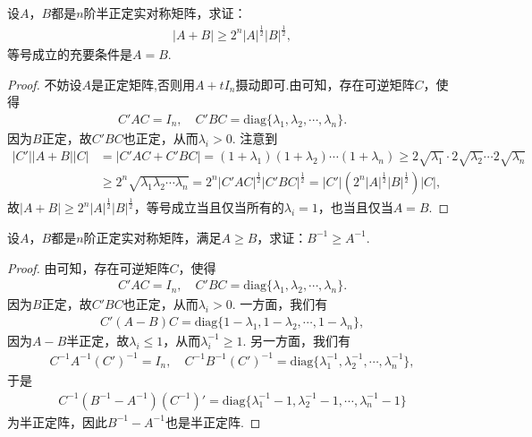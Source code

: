 \documentclass[../../main.tex]{subfiles}%
\begin{document}
\begin{proposition}\label{proposition:例9.77}
设\(A\)，\(B\)都是\(n\)阶半正定实对称矩阵，求证：
\begin{align*}
\vert A + B\vert\geqslant 2^n\vert A\vert^{\frac{1}{2}}\vert B\vert^{\frac{1}{2}},
\end{align*}
等号成立的充要条件是\(A = B\).
\end{proposition}
\begin{proof}
不妨设$A$是正定矩阵,否则用$A+tI_n$摄动即可.由可知，存在可逆矩阵\(C\)，使得
\begin{align*}
C'AC = I_n,\quad C'BC = \mathrm{diag}\{\lambda_1,\lambda_2,\cdots,\lambda_n\}.
\end{align*}
因为\(B\)正定，故\(C'BC\)也正定，从而\(\lambda_i>0\). 注意到
\begin{align*}
\vert C'\vert\vert A + B\vert\vert C\vert&=\vert C'AC + C'BC\vert=(1 + \lambda_1)(1 + \lambda_2)\cdots(1 + \lambda_n)\geqslant 2\sqrt{\lambda _1}\cdot 2\sqrt{\lambda _2}\cdots 2\sqrt{\lambda _n}\\
&\geqslant 2^n\sqrt{\lambda_1\lambda_2\cdots\lambda_n}=2^n\vert C'AC\vert^{\frac{1}{2}}\vert C'BC\vert^{\frac{1}{2}}=\vert C'\vert(2^n\vert A\vert^{\frac{1}{2}}\vert B\vert^{\frac{1}{2}})\vert C\vert,
\end{align*}
故\(\vert A + B\vert\geqslant 2^n\vert A\vert^{\frac{1}{2}}\vert B\vert^{\frac{1}{2}}\)，等号成立当且仅当所有的\(\lambda_i = 1\)，也当且仅当\(A = B\).
\end{proof}

\begin{example}\label{example:例9.78}
设\(A\)，\(B\)都是\(n\)阶正定实对称矩阵，满足\(A\geqslant  B\)，求证：\(B^{-1}\geqslant  A^{-1}\).
\end{example}
\begin{proof}
由可知，存在可逆矩阵\(C\)，使得
\begin{align*}
C'AC = I_n,\quad C'BC = \mathrm{diag}\{\lambda_1,\lambda_2,\cdots,\lambda_n\}.
\end{align*}
因为\(B\)正定，故\(C'BC\)也正定，从而\(\lambda_i>0\). 一方面，我们有
\begin{align*}
C'(A - B)C = \mathrm{diag}\{1 - \lambda_1,1 - \lambda_2,\cdots,1 - \lambda_n\},
\end{align*}
因为\(A - B\)半正定，故\(\lambda_i\leqslant 1\)，从而\(\lambda_i^{-1}\geqslant 1\). 另一方面，我们有
\begin{align*}
C^{-1}A^{-1}(C')^{-1} = I_n,\quad C^{-1}B^{-1}(C')^{-1} = \mathrm{diag}\{\lambda_1^{-1},\lambda_2^{-1},\cdots,\lambda_n^{-1}\},
\end{align*}
于是
\begin{align*}
C^{-1}(B^{-1} - A^{-1})(C^{-1})' = \mathrm{diag}\{\lambda_1^{-1} - 1,\lambda_2^{-1} - 1,\cdots,\lambda_n^{-1} - 1\}
\end{align*}
为半正定阵，因此\(B^{-1} - A^{-1}\)也是半正定阵.
\end{proof}
\end{document}
